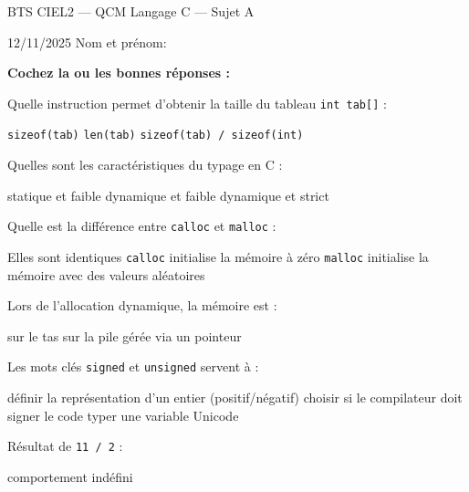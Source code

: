 \documentclass[12pt]{exam}
\begin{document}

\begin{center}
\Large BTS CIEL2 — QCM Langage C — Sujet A
\end{center}
\begin{center}
12/11/2025 \hfill Nom et prénom:\enspace \hrulefill
\end{center}

\textbf{Cochez la ou les bonnes réponses :}

\begin{questions}

\question Quelle instruction permet d’obtenir la taille du tableau \texttt{int tab[]} :
\begin{checkboxes}
 \choice \texttt{sizeof(tab)}
 \choice \texttt{len(tab)}
 \CorrectChoice \texttt{sizeof(tab) / sizeof(int)}
\end{checkboxes}

\question Quelles sont les caractéristiques du typage en C :
\begin{checkboxes}
 \CorrectChoice statique et faible
 \choice dynamique et faible
 \choice dynamique et strict
\end{checkboxes}

\question Quelle est la différence entre \texttt{calloc} et \texttt{malloc} :
\begin{checkboxes}
 \choice Elles sont identiques
 \CorrectChoice \texttt{calloc} initialise la mémoire à zéro
 \choice \texttt{malloc} initialise la mémoire avec des valeurs aléatoires
\end{checkboxes}

\question Lors de l’allocation dynamique, la mémoire est :
\begin{checkboxes}
 \CorrectChoice sur le tas
 \choice sur la pile
 \CorrectChoice gérée via un pointeur
\end{checkboxes}

\question Les mots clés \texttt{signed} et \texttt{unsigned} servent à :
\begin{checkboxes}
 \CorrectChoice définir la représentation d’un entier (positif/négatif)
 \choice choisir si le compilateur doit signer le code
 \choice typer une variable Unicode
\end{checkboxes}

\question Résultat de \texttt{11 / 2} :
\begin{checkboxes}
 \choice comportement indéfini
\end{checkboxes}


\end{questions}
\end{document}
